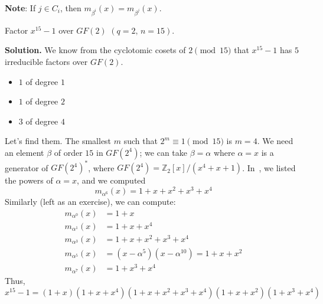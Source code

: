 \textbf{Note}: If $ j\in C_i $, then $ m_{\beta^i}(x)=m_{\beta^j}(x) $.


\begin{Example}{}{}
    Factor $ x^{15}-1 $ over $ GF(2) $ $ (q=2,\,n=15) $.

    \textbf{Solution.} We know from the cyclotomic cosets
    of $ 2\pmod{15} $ that $ x^{15}-1 $ has $ 5 $ irreducible
    factors over $ GF(2) $.
    \begin{itemize}
        \item $ 1 $ of degree $ 1 $
        \item $ 1 $ of degree $ 2 $
        \item $ 3 $ of degree $ 4 $
    \end{itemize}
    Let's find them. The smallest $ m $ such that
    $ 2^m\equiv 1\pmod{15} $ is $ m=4 $. We need an element
    $ \beta $ of order $ 15 $ in $ GF(2^4) $; we can
    take $ \beta=\alpha $ where $ \alpha=x $
    is a generator of $ GF(2^4)^* $, where
    $ GF(2^4)=\mathbb{Z}_2[x]/(x^4+x+1) $. In~,
    we listed the powers of $ \alpha=x $, and we computed
    \[ m_{\alpha^6}(x)=1+x+x^2+x^3+x^4 \]
    Similarly (left as an exercise), we can compute:
    \begin{align*}
        m_{\alpha^0}(x) & =1+x                                 \\
        m_{\alpha^1}(x) & =1+x+x^4                             \\
        m_{\alpha^3}(x) & =1+x+x^2+x^3+x^4                     \\
        m_{\alpha^5}(x) & =(x-\alpha^5)(x-\alpha^{10})=1+x+x^2 \\
        m_{\alpha^7}(x) & =1+x^3+x^4
    \end{align*}
    Thus,
    \[ x^{15}-1=(1+x)(1+x+x^4)(1+x+x^2+x^3+x^4)(1+x+x^2)(1+x^3+x^4) \]
\end{Example}



